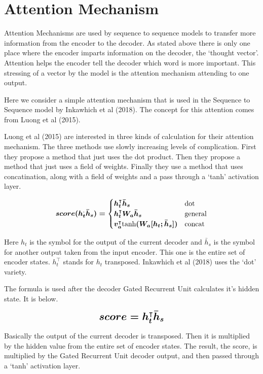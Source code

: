 \section{Attention Mechanism}

Attention Mechanisms are used by sequence to sequence models to transfer more information from the encoder to the decoder. As stated above there is only one place where the encoder imparts information on the decoder, the `thought vector'. Attention helps the encoder tell the decoder which word is more important. This stressing of a vector by the model is the attention mechanism attending to one output.

Here we consider a simple attention mechanism that is used in the Sequence to Sequence model by Inkawhich et al (2018)\cite{2018Inkawhich}. The concept for this attention comes from Luong et al (2015)\cite{DBLP:journals/corr/LuongPM15}.

Luong et al (2015)\cite{DBLP:journals/corr/LuongPM15} are interested in three kinds of calculation for their attention mechanism. The three methods use slowly increasing levels of complication. First they propose a method that just uses the dot product. Then they propose a method that just uses a field of weights. Finally they use a method that uses concatination, along with a field of weights and a pass through a `tanh' activation layer.

$$
\boldmath
score(h_t^ \text{,} \bar{h}_s) =
\begin{cases}
    h_t^\intercal \bar{h}_s & \text{dot} \\
	h_t^\intercal W_a \bar{h}_s & \text{general} \\
	v_a^\intercal \text{tanh}(W_a [h_t ; \bar{h}_s] ) & \text{concat}
\end{cases}
\unboldmath
$$

Here $h_t$ is the symbol for the output of the current decoder and $\bar{h}_s $ is the symbol for another output taken from the input encoder. This one is the entire set of encoder states. $h_t^\intercal$ stands for $h_t$ transposed. Inkawhich et al (2018)\cite{2018Inkawhich} uses the `dot' variety.

The formula is used after the decoder Gated Recurrent Unit calculates it's hidden state. It is below.

$$ 
\boldmath
\mathlarger{ \mathlarger{
score = h_t^\intercal \bar{h}_s 
} }
\unboldmath
$$ 

Basically the output of the current decoder is transposed. Then it is multiplied by the hidden value from the entire set of encoder states. The result, the score, is multiplied by the Gated Recurrent Unit decoder output, and then passed through a `tanh' activation layer.

